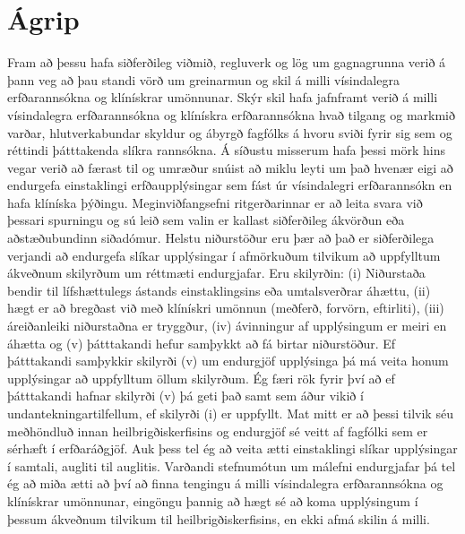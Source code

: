 \documentclass[a4paper,12pt,twoside,BCOR=10mm]{scrbook}
\begin{document}
\section*{\huge Ágrip}
Fram að þessu hafa siðferðileg viðmið, regluverk og lög um gagnagrunna verið á þann veg að þau standi vörð um greinarmun og skil á milli vísindalegra erfðarannsókna og klínískrar umönnunar. Skýr skil hafa jafnframt verið á milli vísindalegra erfðarannsókna og klínískra erfðarannsókna hvað tilgang og markmið varðar, hlutverkabundar skyldur og ábyrgð fagfólks á hvoru sviði fyrir sig sem og réttindi þátttakenda slíkra rannsókna. Á síðustu misserum hafa þessi mörk hins vegar verið að færast til og umræður snúist að miklu leyti um það hvenær eigi að endurgefa einstaklingi erfðaupplýsingar sem fást úr vísindalegri erfðarannsókn en hafa klíníska þýðingu. Meginviðfangsefni ritgerðarinnar er að leita svara við þessari spurningu og sú leið sem valin er kallast siðferðileg ákvörðun eða aðstæðubundinn siðadómur. Helstu niðurstöður eru þær að það er siðferðilega verjandi að endurgefa slíkar upplýsingar í afmörkuðum tilvikum að uppfylltum ákveðnum skilyrðum um réttmæti endurgjafar. Eru skilyrðin: (i) Niðurstaða bendir til lífshættulegs ástands einstaklingsins eða umtalsverðrar áhættu, (ii) hægt er að bregðast við með klínískri umönnun (meðferð, forvörn, eftirliti), (iii) áreiðanleiki niðurstaðna er tryggður, (iv) ávinningur af upplýsingum er meiri en áhætta og (v) þátttakandi hefur samþykkt að fá birtar niðurstöður. Ef þátttakandi samþykkir skilyrði (v) um endurgjöf upplýsinga þá má veita honum upplýsingar að uppfylltum öllum skilyrðum. Ég færi rök fyrir því að ef þátttakandi hafnar skilyrði (v) þá geti það samt sem áður vikið í undantekningartilfellum, ef skilyrði (i) er uppfyllt. Mat mitt er að þessi tilvik séu meðhöndluð innan heilbrigðiskerfisins og endurgjöf sé veitt af fagfólki sem er sérhæft í erfðaráðgjöf. Auk þess tel ég að veita ætti einstaklingi slíkar upplýsingar í samtali, augliti til auglitis. Varðandi stefnumótun um málefni endurgjafar þá tel ég að miða ætti að því að finna tengingu á milli vísindalegra erfðarannsókna og klínískrar umönnunar, eingöngu þannig að hægt sé að koma upplýsingum í þessum ákveðnum tilvikum til heilbrigðiskerfisins, en ekki afmá skilin á milli.
\vfill \vspace*{1cm}
\end{document}
